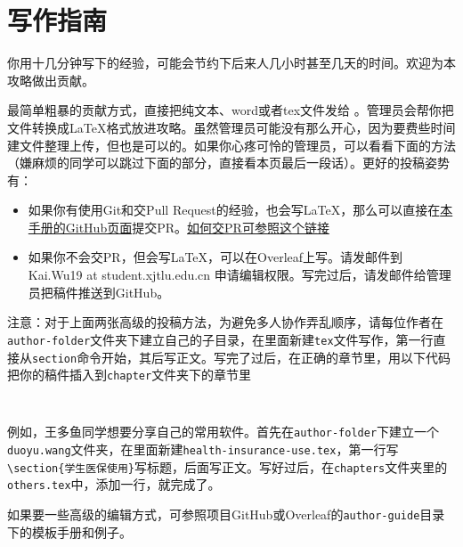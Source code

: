 \chapter{写作指南}
\label{chapter.author-ins}


你用十几分钟写下的经验，可能会节约下后来人几小时甚至几天的时间。欢迎为本攻略做出贡献。

最简单粗暴的贡献方式，直接把纯文本、word或者tex文件发给 \Shiyao。管理员会帮你把文件转换成\LaTeX{}格式放进攻略。虽然管理员可能没有那么开心，因为要费些时间建文件整理上传，但也是可以的。如果你心疼可怜的管理员，可以看看下面的方法（嫌麻烦的同学可以跳过下面的部分，直接看本页最后一段话）。更好的投稿姿势有：


\begin{itemize}
    \item 如果你有使用Git和交Pull Request的经验，也会写\LaTeX{}，那么可以直接在\href{https://github.com/xp-pgrs-unofficial-guide/xp_pgrs_unofficial_guide}{本手册的GitHub页面}提交PR。\href{https://www.zhihu.com/question/21682976/answer/79489643}{如何交PR可参照这个链接}
    \item 如果你不会交PR，但会写\LaTeX{}，可以在Overleaf上写。请发邮件到 Kai.Wu19 at student.xjtlu.edu.cn 申请编辑权限。写完过后，请发邮件给管理员把稿件推送到GitHub。
\end{itemize} 

\vspace{5mm}
注意：对于上面两张高级的投稿方法，为避免多人协作弄乱顺序，请每位作者在\texttt{author-folder}文件夹下建立自己的子目录，在里面新建\texttt{tex}文件写作，第一行直接从\texttt{section}命令开始，其后写正文。写完了过后，在正确的章节里，用以下代码把你的稿件插入到\texttt{chapter}文件夹下的章节里
\begin{lstlisting}
    
\end{lstlisting} 
例如，王多鱼同学想要分享自己的常用软件。首先在\texttt{author-folder}下建立一个\texttt{duoyu.wang}文件夹，在里面新建\texttt{health-insurance-use.tex}，第一行写\lstinline[breaklines=true]!\section{学生医保使用}!写标题，后面写正文。写好过后，在\texttt{chapters}文件夹里的\texttt{others.tex}中，添加一行\lstinline[breaklines=true]!!，就完成了。

\vspace{5mm}
如果要一些高级的编辑方式，可参照项目GitHub或Overleaf的\texttt{author-guide}目录下的模板手册和例子。

